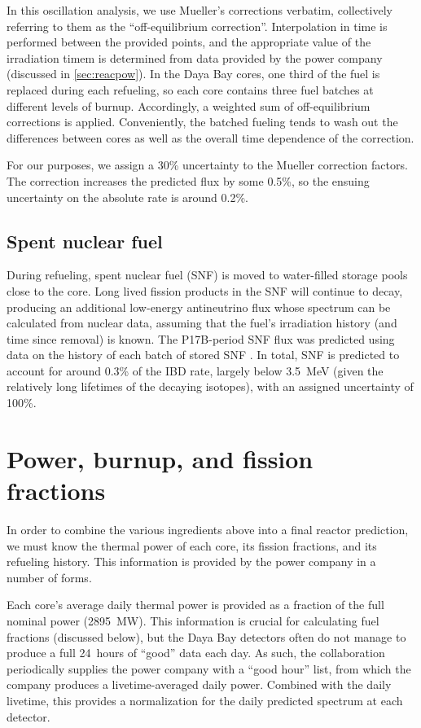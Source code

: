 \documentclass[../thesis.tex]{subfiles}
\begin{document}
In this oscillation analysis, we use Mueller's corrections verbatim, collectively referring to them as the ``off-equilibrium correction''. Interpolation in time is performed between the provided points, and the appropriate value of the irradiation timem is determined from data provided by the power company (discussed in \autoref{sec:reacpow}). In the Daya Bay cores, one third of the fuel is replaced during each refueling, so each core contains three fuel batches at different levels of burnup. Accordingly, a weighted sum of off-equilibrium corrections is applied. Conveniently, the batched fueling tends to wash out the differences between cores as well as the overall time dependence of the correction.

For our purposes, we assign a 30\% uncertainty to the Mueller correction factors. The correction increases the predicted flux by some 0.5\%, so the ensuing uncertainty on the absolute rate is around 0.2\%.

\subsection{Spent nuclear fuel}
\label{sec:snfcorr}

During refueling, spent nuclear fuel (SNF) is moved to water-filled storage pools close to the core. Long lived fission products in the SNF will continue to decay, producing an additional low-energy antineutrino flux whose spectrum can be calculated from nuclear data, assuming that the fuel's irradiation history (and time since removal) is known. The P17B-period SNF flux was predicted using data on the history of each batch of stored SNF \cite{p17bSnf}. In total, SNF is predicted to account for around 0.3\% of the IBD rate, largely below 3.5~MeV (given the relatively long lifetimes of the decaying isotopes), with an assigned uncertainty of 100\%.

\section{Power, burnup, and fission fractions}
\label{sec:reacpow}

In order to combine the various ingredients above into a final reactor prediction, we must know the thermal power of each core, its fission fractions, and its refueling history. This information is provided by the power company in a number of forms.

Each core's average daily thermal power is provided as a fraction of the full nominal power (2895~MW). This information is crucial for calculating fuel fractions (discussed below), but the Daya Bay detectors often do not manage to produce a full 24~hours of ``good'' data each day. As such, the collaboration periodically supplies the power company with a ``good hour'' list, from which the company produces a livetime-averaged daily power. Combined with the daily livetime, this provides a normalization for the daily predicted spectrum at each detector.
\end{document}
